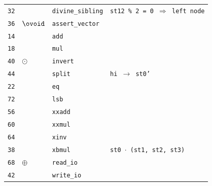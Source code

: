\documentclass{article}
\makeatletter
\newcommand\incircbin
{\mathpalette\@incircbin}
\newcommand\@incircbin[2]
{\mathbin{\ooalign{\hidewidth$#1#2$\hidewidth\crcr$#1\ovoid$}}}
\newcommand{\ocol}{\incircbin{\raisebox{0.4pt}{:}}}
\newcommand{\shrinkstack}[1]{\tikzmarknode[fill=instr-shrink-stack,circle,inner sep=-1pt]{circ}{#1}}
\newcommand{\hintdivinesib}{
    \textcolor{hint}{\texttt{st12 \% 2 = 0 $\Rightarrow$ left node}}
}
\newcommand{\hintsplit}{
    \textcolor{hint}{\texttt{hi $\rightarrow$ st0'}}
}
\newcommand{\hintxbmul}{
    \textcolor{hint}{\texttt{st0 $\cdot$ (st1, st2, st3)}}
}
\newcommand{\ssominus}{
    \shrinkstack{\ensuremath{\ominus}}
}
\newcommand{\ssocol}{
    \raisebox{6pt}{\shrinkstack{\raisebox{-6pt}{\ensuremath{\ocol}}}} %
}
\makeatother
\begin{document}
\begin{minipage}{0.3\textwidth}
\begin{tabular}{rlll}
    \texttt{32} &                                  & \texttt{divine\_sibling}                                     & \hintdivinesib \\
    \texttt{36} & $\ovoid$                         & \texttt{assert\_vector}                                      &                \\
    \texttt{14} & \ssocol                          & \texttt{add}                                                 &                \\
    \texttt{18} & \ssocol                          & \texttt{mul}                                                 &                \\
    \texttt{40} & $\odot$                          & \texttt{invert}                                              &                \\
    \texttt{44} &                                  & \texttt{split}                                               & \hintsplit     \\
    \texttt{22} & \ssocol                          & \texttt{eq}                                                  &                \\
    \texttt{72} &                                  & \texttt{lsb}                                                 &                \\
    \texttt{56} &                                  & \texttt{xxadd}                                               &                \\
    \texttt{60} &                                  & \texttt{xxmul}                                               &                \\
    \texttt{64} &                                  & \texttt{xinv}                                                &                \\
    \texttt{38} & \shrinkstack{\phantom{$\ovoid$}} & \texttt{xbmul}                                               & \hintxbmul     \\
    \texttt{68} & $\oplus$                         & \texttt{read\_io}                                            &                \\
    \texttt{42} & \ssominus                        & \texttt{write\_io}                                           &
\end{tabular}
\end{minipage}\hfill%
\end{document}
